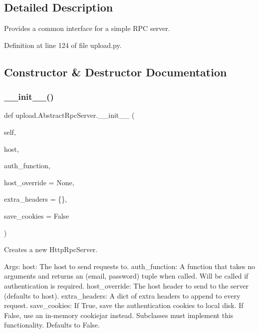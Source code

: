 \subsection{Detailed Description}
\begin{DoxyVerb}Provides a common interface for a simple RPC server.\end{DoxyVerb}
 

Definition at line 124 of file upload.\+py.



\subsection{Constructor \& Destructor Documentation}
\mbox{\label{classupload_1_1AbstractRpcServer_a3f6bc1bd16b52bd5a5c33a1fedeef2d0}} 
\subsubsection{\texorpdfstring{\+\_\+\+\_\+init\+\_\+\+\_\+()}{\_\_init\_\_()}\hspace{0.1cm}{\footnotesize\ttfamily [1/2]}}
{\footnotesize\ttfamily def upload.\+Abstract\+Rpc\+Server.\+\_\+\+\_\+init\+\_\+\+\_\+ (\begin{DoxyParamCaption}\item[{}]{self,  }\item[{}]{host,  }\item[{}]{auth\+\_\+function,  }\item[{}]{host\+\_\+override = {\ttfamily None},  }\item[{}]{extra\+\_\+headers = {\ttfamily \{\}},  }\item[{}]{save\+\_\+cookies = {\ttfamily False} }\end{DoxyParamCaption})}

\begin{DoxyVerb}Creates a new HttpRpcServer.

Args:
  host: The host to send requests to.
  auth_function: A function that takes no arguments and returns an
(email, password) tuple when called. Will be called if authentication
is required.
  host_override: The host header to send to the server (defaults to host).
  extra_headers: A dict of extra headers to append to every request.
  save_cookies: If True, save the authentication cookies to local disk.
If False, use an in-memory cookiejar instead.  Subclasses must
implement this functionality.  Defaults to False.
\end{DoxyVerb}
 

